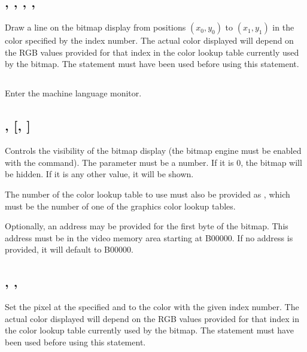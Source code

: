 \documentclass{report}
\begin{document}
    \subsection*{ , , , , }

    Draw a line on the bitmap display from positions $(x_0, y_0)$ to $(x_1, y_1)$ in the color
    specified by the  index number.
    The actual color displayed will depend on the RGB values provided for
    that index in the color lookup table currently used by the bitmap.
    The  statement must have been used before using
    this statement.

    \subsection*{}

    Enter the machine language monitor.

    \subsection*{ ,  [, ]}

    Controls the visibility of the bitmap display (the bitmap engine must be
    enabled with the  command). The parameter 
    must be a number. If it is 0, the bitmap will be hidden. If it is any other
    value, it will be shown.

    The number of the color lookup table to use must also be provided as ,
    which must be the number of one of the graphics color lookup tables.

    Optionally, an address may be provided for the first byte of the bitmap.
    This address must be in the video memory area starting at B00000.
    If no address is provided, it will default to B00000.

    \subsection*{ , , }

    Set the pixel at the specified  and  to the
    color with the given  index number.
    The actual color displayed will depend on the RGB values provided for
    that index in the color lookup table currently used by the bitmap.
    The  statement must have been used before using
    this statement.
\end{document}
